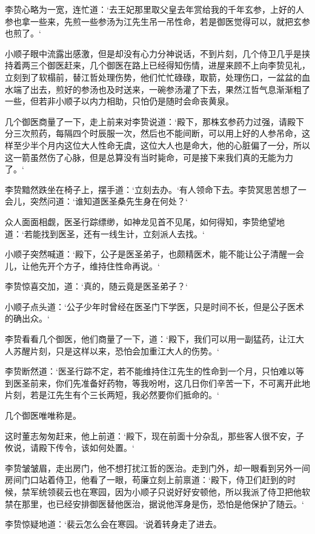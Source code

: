 李贽心略为一宽，连忙道：‘去王妃那里取父皇去年赏给我的千年玄参，上好的人参也拿一些来，先煎一些参汤为江先生吊一吊性命，若是御医觉得可以，就把玄参也煎了。‘

小顺子眼中流露出感激，但是却没有心力分神说话，不到片刻，几个侍卫几乎是挟持着两三个御医赶来，几个御医在路上已经得知伤情，进屋来顾不上向李贽见礼，立刻到了软榻前，替江哲处理伤势，他们忙忙碌碌，取箭，处理伤口，一盆盆的血水端了出去，煎好的参汤也及时送来，一碗参汤灌了下去，果然江哲气息渐渐粗了一些，但若非小顺子以内力相助，只怕仍是随时会命丧黄泉。

几个御医商量了一下，走上前来对李贽说道：‘殿下，那株玄参药力过强，请殿下分三次煎药，每隔四个时辰服一次，然后也不能间断，可以用上好的人参吊命，这样至少半个月内这位大人性命无虞，这位大人也是命大，他的心脏偏了一分，所以这一箭虽然伤了心脉，但是总算没有当时毙命，可是接下来我们真的无能为力了。‘

李贽黯然跌坐在椅子上，摆手道：‘立刻去办。‘有人领命下去。李贽冥思苦想了一会儿，突然问道：‘谁知道医圣桑先生身在何处？‘

众人面面相觑，医圣行踪缥缈，如神龙见首不见尾，如何得知，李贽绝望地道：‘若能找到医圣，还有一线生计，立刻派人去找。‘

小顺子突然喊道：‘殿下，公子是医圣弟子，也颇精医术，能不能让公子清醒一会儿，让他先开个方子，维持住性命再说。‘

李贽惊喜交加，道：‘真的，随云竟是医圣弟子？‘

小顺子点头道：‘公子少年时曾经在医圣门下学医，只是时间不长，但是公子医术的确出众。‘

李贽看看几个御医，他们商量了一下，道：‘殿下，我们可以用一副猛药，让江大人苏醒片刻，只是这样以来，恐怕会加重江大人的伤势。‘

李贽断然道：‘医圣行踪不定，若不能维持住江先生的性命到一个月，只怕难以等到医圣前来，你们先准备好药物，等我吩咐，这几日你们辛苦一下，不可离开此地片刻，若是江先生有个三长两短，我必然要你们抵命的。‘

几个御医唯唯称是。

这时董志匆匆赶来，他上前道：‘殿下，现在前面十分杂乱，那些客人很不安，子攸说，请殿下传令，该如何处置。‘

李贽皱皱眉，走出房门，他不想打扰江哲的医治。走到门外，却一眼看到另外一间房间门口站着侍卫，他看了一眼，苟廉立刻上前禀道：‘殿下，侍卫们赶到的时候，禁军统领裴云也在寒园，因为小顺子只说好好安顿他，所以我派了侍卫把他软禁在那里，也已经安排御医替他医治，据说他浑身是伤，恐怕是他保护了随云。‘

李贽惊疑地道：‘裴云怎么会在寒园。‘说着转身走了进去。

